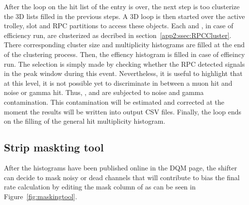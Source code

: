 	After the loop on the hit list of the entry is over, the next step is too clusterize the 3D lists filled in the previous steps. A 3D loop is then started over the active trolley, slot and RPC partitions to access these objects. Each  and , in case of efficiency run, are clusterized as decribed in section~\ref{app2:ssec:RPCCluster}. There corresponding cluster size and multiplicity histograms are filled at the end of the clustering process. Then, the effiency histogram is filled in case of effieincy run. The selection is simply made by checking whether the RPC detected signals in the peak window during this event. Nevertheless, it is useful to highlight that at this level, it is not possible yet to discriminate in between a muon hit and noise or gamma hit. Thus, ,  and  are subjected to noise and gamma contamination. This contamination will be estimated and corrected at the moment the results will be written into output CSV files. Finally, the loop ends on the filling of the general hit multiplicity histogram.
	
	\subsection{Strip maskting tool}
	\label{app2:ssec:mask}
	
	After the histograms have been published online in the DQM page, the shifter can decide to mask noisy or dead channels that will contribute to bias the final rate calculation by editing the mask column of  as can be seen in Figure~\ref{fig:maskingtool}.
	
